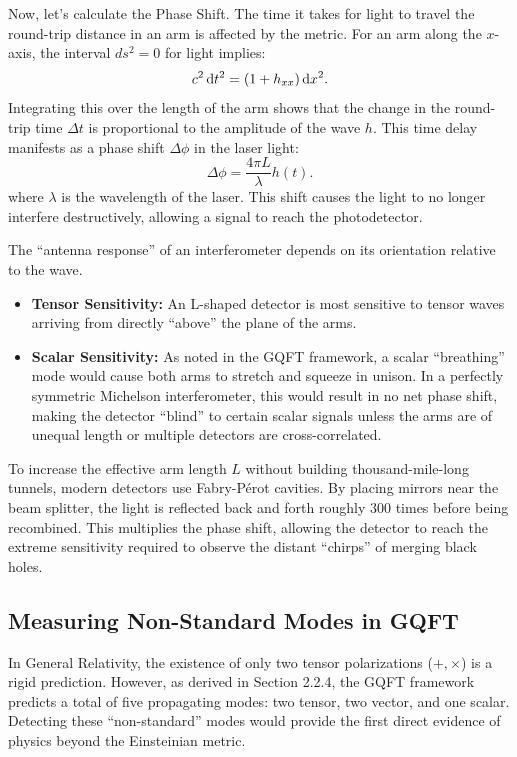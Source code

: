 Now, let's calculate the Phase Shift. The time it takes for light to travel the round-trip distance in an arm is affected by the metric. For an arm along the $x$-axis, the interval $ds^2 = 0$ for light implies:
\[%
  c^2 \dt^2 = (1 + h_{xx}) \dx^2
.\]%
Integrating this over the length of the arm shows that the change in the round-trip time $\Delta t$ is proportional to the amplitude of the wave $h$. This time delay manifests as a phase shift $\Delta \phi$ in the laser light:
\[%
  \Delta \phi = \frac{4\pi L}{\lambda} h(t)
.\]%
where $\lambda$ is the wavelength of the laser. This shift causes the light to no longer interfere destructively, allowing a signal to reach the photodetector.

The ``antenna response'' of an interferometer depends on its orientation relative to the wave.
\begin{itemize}
  \item \textbf{Tensor Sensitivity:} An L-shaped detector is most sensitive to tensor waves arriving from directly ``above'' the plane of the arms.
  \item \textbf{Scalar Sensitivity:} As noted in the GQFT framework, a scalar ``breathing'' mode would cause both arms to stretch and squeeze in unison. In a perfectly symmetric Michelson interferometer, this would result in no net phase shift, making the detector ``blind'' to certain scalar signals unless the arms are of unequal length or multiple detectors are cross-correlated.
\end{itemize}

To increase the effective arm length $L$ without building thousand-mile-long tunnels, modern detectors use Fabry-Pérot cavities. By placing mirrors near the beam splitter, the light is reflected back and forth roughly 300 times before being recombined. This multiplies the phase shift, allowing the detector to reach the extreme sensitivity required to observe the distant ``chirps'' of merging black holes.

\subsection{Measuring Non-Standard Modes in GQFT} In General Relativity, the existence of only two tensor polarizations ($+, \times$) is a rigid prediction. However, as derived in Section 2.2.4, the GQFT framework predicts a total of five propagating modes: two tensor, two vector, and one scalar. Detecting these ``non-standard'' modes would provide the first direct evidence of physics beyond the Einsteinian metric.

